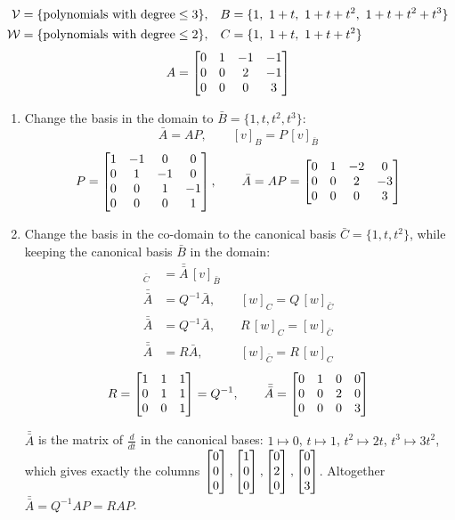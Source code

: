 \begin{example}
\begin{align*}
\V&=\{\text{polynomials with degree}\le 3\}, & B&=\{1,\ 1+t,\ 1+t+t^2,\ 1+t+t^2+t^3\}\\
\W&=\{\text{polynomials with degree}\le 2\}, & C&=\{1,\ 1+t,\ 1+t+t^2\}
\end{align*}
\[
A=\begin{bmatrix}0&1&-1&-1\\0&0&2&-1\\0&0&0&3\end{bmatrix}
\]

\begin{enumerate}[label=\arabic*.]
\item\leavevmode{}Change the basis in the domain to $\bar B=\{1,t,t^2,t^3\}$:
\[
\bar A=AP, \qquad [v]_B=P\,[v]_{\bar B}
\]
\[
P=\begin{bmatrix}1&-1&0&0\\0&1&-1&0\\0&0&1&-1\\0&0&0&1\end{bmatrix},
\qquad
\bar A=AP=\begin{bmatrix}0&1&-2&0\\0&0&2&-3\\0&0&0&3\end{bmatrix}
\]
\item Change the basis in the co-domain to the canonical basis $\bar C=\{1,t,t^2\}$, while keeping the canonical basis $\bar B$ in the domain:
\begin{align*}
[w]_{\bar C}&=\bar{\bar A}\,[v]_{\bar B}\\
\bar{\bar A}&=Q^{-1}\bar A, && [w]_C=Q\,[w]_{\bar C}\\
\bar{\bar A}&=Q^{-1}\bar A, && R\,[w]_C=[w]_{\bar C}\\
\bar{\bar A}&=R\bar A, && [w]_{\bar C}=R\,[w]_C
\end{align*}
\[
R=\begin{bmatrix}1&1&1\\0&1&1\\0&0&1\end{bmatrix}=Q^{-1},
\qquad
\bar{\bar A}=\begin{bmatrix}0&1&0&0\\0&0&2&0\\0&0&0&3\end{bmatrix}
\]
\begin{insight}[Check]
$\bar{\bar A}$ is the matrix of $\frac{d}{dt}$ in the canonical bases: $1\mapsto0$, $t\mapsto1$, $t^2\mapsto2t$, $t^3\mapsto3t^2$, which gives exactly the columns $\begin{bmatrix}0\\0\\0\end{bmatrix},\begin{bmatrix}1\\0\\0\end{bmatrix},\begin{bmatrix}0\\2\\0\end{bmatrix},\begin{bmatrix}0\\0\\3\end{bmatrix}$. Altogether $\bar{\bar A}=Q^{-1}AP=RAP$.
\end{insight}
\end{enumerate}
\end{example}
